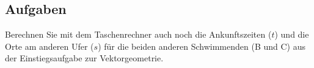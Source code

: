 \subsection*{Aufgaben}

Berechnen Sie mit dem Taschenrechner auch noch die Ankunftszeiten ($t$) und die Orte am anderen Ufer
($s$) für die beiden anderen Schwimmenden (B und C) aus der
Einstiegsaufgabe zur Vektorgeometrie.


\newpage
